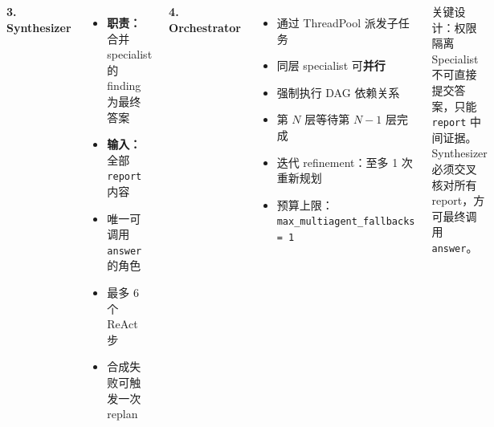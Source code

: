 \documentclass[11pt, aspectratio=169]{beamer}
\begin{document}
\begin{frame}[t]
\begin{columns}[T,onlytextwidth]

\textbf{3. Synthesizer}
\begin{itemize}
    \setlength\itemsep{0.05em}
    \item \textbf{职责：}合并 specialist 的 finding 为最终答案
    \item \textbf{输入：}全部 \texttt{report} 内容
    \item 唯一可调用 \texttt{answer} 的角色
    \item 最多 6 个 ReAct 步
    \item 合成失败可触发一次 replan
\end{itemize}

\vspace{0.25em}

\textbf{4. Orchestrator}
\begin{itemize}
    \setlength\itemsep{0.05em}
    \item 通过 ThreadPool 派发子任务
    \item 同层 specialist 可\textbf{并行}
    \item 强制执行 DAG 依赖关系
    \item 第 $N$ 层等待第 $N-1$ 层完成
    \item 迭代 refinement：至多 1 次重新规划
    \item 预算上限：\texttt{max\_multiagent\_fallbacks = 1}
\end{itemize}

\vspace{0.25em}

\begin{block}{关键设计：权限隔离}
\tiny
Specialist 不可直接提交答案，只能 \texttt{report} 中间证据。
Synthesizer 必须交叉核对所有 report，方可最终调用 \texttt{answer}。
\end{block}

\end{columns}
\end{frame}
\end{document}
